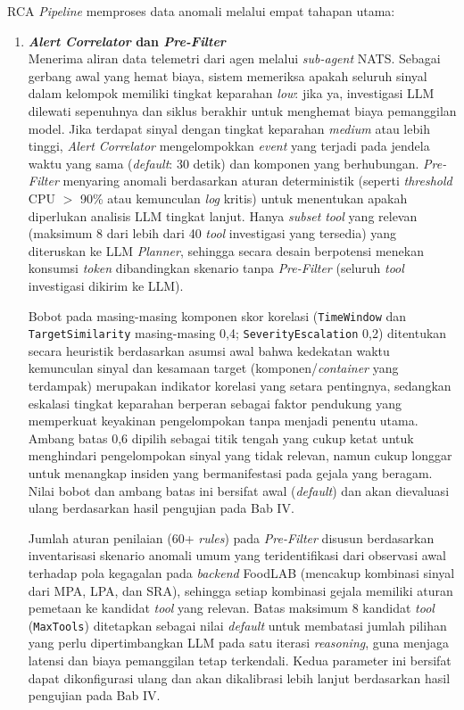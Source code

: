 RCA \textit{Pipeline} memproses data anomali melalui empat tahapan utama:
\begin{enumerate}[label=\arabic*., leftmargin=*]
  \item \textbf{\textit{Alert Correlator} dan \textit{Pre-Filter}}\\
        Menerima aliran data telemetri dari agen melalui \textit{sub-agent} NATS. Sebagai gerbang awal yang hemat biaya, sistem memeriksa apakah seluruh sinyal dalam kelompok memiliki tingkat keparahan \textit{low}: jika ya, investigasi LLM dilewati sepenuhnya dan siklus berakhir untuk menghemat biaya pemanggilan model. Jika terdapat sinyal dengan tingkat keparahan \textit{medium} atau lebih tinggi, \textit{Alert Correlator} mengelompokkan \textit{event} yang terjadi pada jendela waktu yang sama (\textit{default}: 30 detik) dan komponen yang berhubungan. \textit{Pre-Filter} menyaring anomali berdasarkan aturan deterministik (seperti \textit{threshold} CPU $>$ 90\% atau kemunculan \textit{log} kritis) untuk menentukan apakah diperlukan analisis LLM tingkat lanjut. Hanya \textit{subset} \textit{tool} yang relevan (maksimum 8 dari lebih dari 40 \textit{tool} investigasi yang tersedia) yang diteruskan ke LLM \textit{Planner}, sehingga secara desain berpotensi menekan konsumsi \textit{token} dibandingkan skenario tanpa \textit{Pre-Filter} (seluruh \textit{tool} investigasi dikirim ke LLM).

  Bobot pada masing-masing komponen skor korelasi (\texttt{TimeWindow} dan \texttt{TargetSimilarity} masing-masing 0,4; \texttt{SeverityEscalation} 0,2) ditentukan secara heuristik berdasarkan asumsi awal bahwa kedekatan waktu kemunculan sinyal dan kesamaan target (komponen/\textit{container} yang terdampak) merupakan indikator korelasi yang setara pentingnya, sedangkan eskalasi tingkat keparahan berperan sebagai faktor pendukung yang memperkuat keyakinan pengelompokan tanpa menjadi penentu utama. Ambang batas 0,6 dipilih sebagai titik tengah yang cukup ketat untuk menghindari pengelompokan sinyal yang tidak relevan, namun cukup longgar untuk menangkap insiden yang bermanifestasi pada gejala yang beragam. Nilai bobot dan ambang batas ini bersifat awal (\textit{default}) dan akan dievaluasi ulang berdasarkan hasil pengujian pada Bab IV.

  Jumlah aturan penilaian (60+ \textit{rules}) pada \textit{Pre-Filter} disusun berdasarkan inventarisasi skenario anomali umum yang teridentifikasi dari observasi awal terhadap pola kegagalan pada \textit{backend} FoodLAB (mencakup kombinasi sinyal dari MPA, LPA, dan SRA), sehingga setiap kombinasi gejala memiliki aturan pemetaan ke kandidat \textit{tool} yang relevan. Batas maksimum 8 kandidat \textit{tool} (\texttt{MaxTools}) ditetapkan sebagai nilai \textit{default} untuk membatasi jumlah pilihan yang perlu dipertimbangkan LLM pada satu iterasi \textit{reasoning}, guna menjaga latensi dan biaya pemanggilan tetap terkendali. Kedua parameter ini bersifat dapat dikonfigurasi ulang dan akan dikalibrasi lebih lanjut berdasarkan hasil pengujian pada Bab IV.


\end{enumerate}
